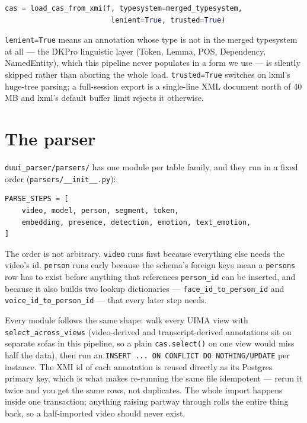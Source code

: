 \documentclass[11pt]{article}
\begin{document}
\begin{lstlisting}[language=Python]
cas = load_cas_from_xmi(f, typesystem=merged_typesystem,
                         lenient=True, trusted=True)
\end{lstlisting}

\texttt{lenient=True} means an annotation whose type is not in the merged
typesystem at all --- the DKPro linguistic layer (Token, Lemma, POS,
Dependency, NamedEntity), which this pipeline never populates in a form we
use --- is silently skipped rather than aborting the whole load.
\texttt{trusted=True} switches on lxml's huge-tree parsing; a full-session
export is a single-line XML document north of 40\,MB and lxml's default
buffer limit rejects it otherwise.

\section{The parser}

\texttt{duui\_parser/parsers/} has one module per table family, and they run
in a fixed order (\texttt{parsers/\_\_init\_\_.py}):

\begin{lstlisting}[language=Python]
PARSE_STEPS = [
    video, model, person, segment, token,
    embedding, presence, detection, emotion, text_emotion,
]
\end{lstlisting}

The order is not arbitrary. \texttt{video} runs first because everything
else needs the video's id. \texttt{person} runs early because the schema's
foreign keys mean a \texttt{persons} row has to exist before anything that
references \texttt{person\_id} can be inserted, and because it also builds
two lookup dictionaries --- \texttt{face\_id\_to\_person\_id} and
\texttt{voice\_id\_to\_person\_id} --- that every later step needs.

Every module follows the same shape: walk every UIMA view with
\texttt{select\_across\_views} (video-derived and transcript-derived
annotations sit on separate sofas in this pipeline, so a plain
\texttt{cas.select()} on one view would miss half the data), then run an
\texttt{INSERT ... ON CONFLICT DO NOTHING/UPDATE} per instance. The XMI id
of each annotation is reused directly as its Postgres primary key, which is
what makes re-running the same file idempotent --- rerun it twice and you get
the same rows, not duplicates. The whole import happens inside one
transaction; anything raising partway through rolls the entire thing back,
so a half-imported video should never exist.
\end{document}
